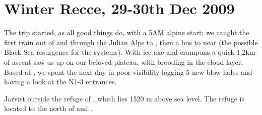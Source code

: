 \section{Winter Recce, 29-30th Dec 2009}

The trip started, as all good things do, with a 5AM alpine start; we caught the first train out of  and through the Julian Alps to , then a bus to  near  (the possible Black Sea resurgence for the  systems). With ice axe and crampons a quick 1.2km of ascent saw us up on our beloved plateau, with  brooding in the cloud layer. Based at , we spent the next day in poor visibility logging 5 new blow holes and having a look at the N1-3 entrances.



\begin{pagefigure}
\checkoddpage \ifoddpage \forcerectofloat \else \forceversofloat \fi
{}
\caption{Jarvist outside the refuge of , which lies 1520 m above sea level. The refuge is located to the north of  and . } \label{Dom na Komni in snow}
\end{pagefigure}




